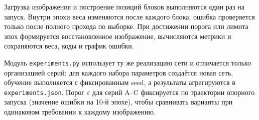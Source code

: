 Загрузка изображения и построение позиций блоков выполняются один раз на запуск. Внутри эпохи веса изменяются после каждого блока; ошибка проверяется только после полного прохода по выборке. При достижении порога или лимита эпох формируется восстановленное изображение, вычисляются метрики и сохраняются веса, коды и график ошибки.

Модуль \texttt{experiments.py} использует ту же реализацию сети и отличается только организацией серий: для каждого набора параметров создаётся новая сеть, обучение выполняется с фиксированным seed, а результаты агрегируются в \texttt{experiments.json}. Порог $\varepsilon$ для серий A--C фиксируется по траектории опорного запуска (значение ошибки на 10-й эпохе), чтобы сравнивать варианты при одинаковом требовании к каждому изображению.
